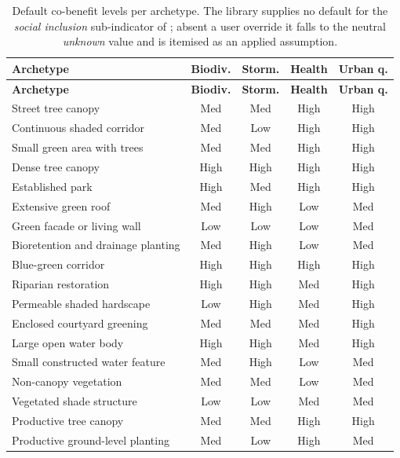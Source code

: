 \begin{longtable}{@{}>{\raggedright\arraybackslash}p{62mm}cccc@{}}
\caption[Co-benefit defaults]{Default co-benefit levels per archetype. The
library supplies no default for the \emph{social inclusion} sub-indicator of
; absent a user override it falls to the neutral
\emph{unknown} value and is itemised as an applied assumption.}
\label{tab:app-cobenefits}\\
\toprule
\textbf{Archetype} & \textbf{Biodiv.} &
\textbf{Storm.} & \textbf{Health} & \textbf{Urban q.} \\
\midrule
\endfirsthead
\toprule
\textbf{Archetype} & \textbf{Biodiv.} &
\textbf{Storm.} & \textbf{Health} & \textbf{Urban q.} \\
\midrule
\endhead
\bottomrule
\endlastfoot
Street tree canopy & Med & Med & High & High \\
Continuous shaded corridor & Med & Low & High & High \\
Small green area with trees & Med & Med & High & High \\
Dense tree canopy & High & High & High & High \\
Established park & High & Med & High & High \\
Extensive green roof & Med & High & Low & Med \\
Green facade or living wall & Low & Low & Low & Med \\
Bioretention and drainage planting & Med & High & Low & Med \\
Blue-green corridor & High & High & High & High \\
Riparian restoration & High & High & Med & High \\
Permeable shaded hardscape & Low & High & Med & High \\
Enclosed courtyard greening & Med & Med & Med & High \\
Large open water body & High & High & Med & High \\
Small constructed water feature & Med & High & Low & Med \\
Non-canopy vegetation & Med & Med & Low & Med \\
Vegetated shade structure & Low & Low & Med & Med \\
Productive tree canopy & Med & Med & High & High \\
Productive ground-level planting & Med & Low & High & Med \\
\end{longtable}

